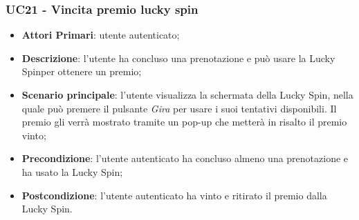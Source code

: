 \subsubsection{UC21 - Vincita premio lucky spin}
\begin{itemize}
	\item \textbf{Attori Primari}: utente autenticato;
	\item \textbf{Descrizione}: l'utente ha concluso una prenotazione e può usare la Lucky Spin\glosp per ottenere un premio;	
	\item \textbf{Scenario principale}: l'utente visualizza la schermata della Lucky Spin, nella quale può premere il pulsante \textit{Gira} per usare i suoi tentativi disponibili. Il premio gli verrà mostrato tramite un pop-up che metterà in risalto il premio vinto;
	\item \textbf{Precondizione}: l'utente autenticato ha concluso almeno una prenotazione e ha usato la Lucky Spin;
	\item \textbf{Postcondizione}: l'utente autenticato ha vinto e ritirato il premio dalla Lucky Spin.
\end{itemize}
